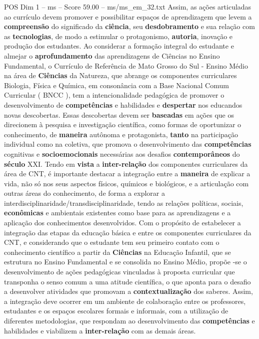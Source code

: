 \begin{textsample}{POS Dim 1 – ms – Score 59.00 – ms/ms\_em\_32.txt}
Assim, as ações articuladas ao currículo devem promover e possibilitar espaços de aprendizagem que levem a \textbf{compreensão} do significado da \textbf{ciência}, seu \textbf{desdobramento} e sua relação com as \textbf{tecnologias}, de modo a estimular o protagonismo, \textbf{autoria}, inovação e produção dos estudantes.
Ao considerar a formação integral do estudante e almejar o \textbf{aprofundamento} das aprendizagens de Ciências no Ensino Fundamental, o Currículo de Referência de Mato Grosso do Sul - Ensino Médio na área de \textbf{Ciências} da Natureza, que abrange os componentes curriculares Biologia, Física e Química, em consonância com a Base Nacional Comum Curricular ( BNCC ), tem a intencionalidade pedagógica de promover o desenvolvimento de \textbf{competências} e habilidades e \textbf{despertar} nos educandos novas descobertas.
Essas descobertas devem ser \textbf{baseadas} em ações que os direcionem à pesquisa e investigação científica, como formas de oportunizar o conhecimento, de \textbf{maneira} autônoma e protagonista, \textbf{tanto} na participação individual como na coletiva, que promova o desenvolvimento das \textbf{competências} cognitivas e \textbf{socioemocionais} necessárias aos desafios \textbf{contemporâneos} do \textbf{século} XXI.
Tendo em \textbf{vista} a \textbf{inter-relação} dos componentes curriculares da área de CNT, é importante destacar a integração entre a \textbf{maneira} de explicar a vida, não só nos seus aspectos físicos, químicos e biológicos, e a articulação com outras áreas do conhecimento, de forma a explorar a interdisciplinaridade/transdisciplinaridade, tendo as relações políticas, sociais, \textbf{econômicas} e ambientais existentes como base para as aprendizagens e a aplicação dos conhecimentos desenvolvidos.
Com o propósito de estabelecer a integração das etapas da educação básica e entre os componentes curriculares da CNT, e considerando que o estudante tem seu primeiro contato com o conhecimento científico a partir da \textbf{Ciências} na Educação Infantil, que se estrutura no Ensino Fundamental e se consolida no Ensino Médio, propõe -se o desenvolvimento de ações pedagógicas vinculadas à proposta curricular que transponha o senso comum a uma atitude científica, o que aponta para o desafio a desenvolver atividades que promovam a \textbf{contextualização} dos saberes.
Assim, a integração deve ocorrer em um ambiente de colaboração entre os professores, estudantes e os espaços escolares formais e informais, com a utilização de diferentes metodologias, que respondam ao desenvolvimento das \textbf{competências} e habilidades e viabilizem a \textbf{inter-relação} com as demais áreas.

\end{textsample}
